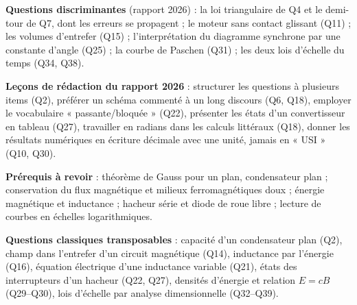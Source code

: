 \documentclass[11pt,a4paper]{article}
\begin{document}
\textbf{Questions discriminantes} (rapport 2026) : la loi triangulaire de Q4 et le demi-tour de Q7, dont les erreurs se propagent ; le moteur sans contact glissant (Q11) ; les volumes d'entrefer (Q15) ; l'interprétation du diagramme synchrone par une constante d'angle (Q25) ; la courbe de Paschen (Q31) ; les deux lois d'échelle du temps (Q34, Q38).

\textbf{Leçons de rédaction du rapport 2026} : structurer les questions à plusieurs items (Q2), préférer un schéma commenté à un long discours (Q6, Q18), employer le vocabulaire « passante/bloquée » (Q22), présenter les états d'un convertisseur en tableau (Q27), travailler en radians dans les calculs littéraux (Q18), donner les résultats numériques en écriture décimale avec une unité, jamais en « USI » (Q10, Q30).

\textbf{Prérequis à revoir} : théorème de Gauss pour un plan, condensateur plan ; conservation du flux magnétique et milieux ferromagnétiques doux ; énergie magnétique et inductance ; hacheur série et diode de roue libre ; lecture de courbes en échelles logarithmiques.

\textbf{Questions classiques transposables} : capacité d'un condensateur plan (Q2), champ dans l'entrefer d'un circuit magnétique (Q14), inductance par l'énergie (Q16), équation électrique d'une inductance variable (Q21), états des interrupteurs d'un hacheur (Q22, Q27), densités d'énergie et relation \(E=cB\) (Q29--Q30), lois d'échelle par analyse dimensionnelle (Q32--Q39).
\end{document}
